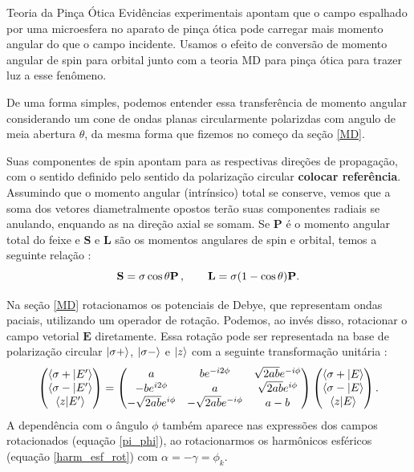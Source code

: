 \begin{chapter}{Teoria da Pinça Ótica}
Evidências experimentais apontam que o campo espalhado por uma microesfera no aparato de pinça ótica pode carregar mais momento angular do que o campo incidente. Usamos o efeito de conversão de momento angular de spin para orbital junto com a teoria MD para pinça ótica para trazer luz a esse fenômeno.

De uma forma simples, podemos entender essa transferência de momento angular considerando um cone de ondas planas circularmente polarizdas com angulo de meia abertura $\theta$, da mesma forma que fizemos no começo da seção \ref{MD}. 

Suas componentes de spin apontam para as respectivas direções de propagação, com o sentido definido pelo sentido da polarização circular {\bf colocar referência}. Assumindo que o momento angular (intrínsico) total se conserve, vemos que a soma dos vetores diametralmente opostos terão suas componentes radiais se anulando, enquando as na direção axial se somam. Se ${\mathbf P}$ é o momento angular total do feixe e ${\mathbf S}$ e ${\mathbf L}$ são os momentos angulares de spin e orbital, temos a seguinte relação \cite{Bliokh2015}:
%
\begin{equation}
{\mathbf S}=\sigma\cos\theta{\mathbf P}\thinspace, \quad\quad {\mathbf L}=\sigma(1-\cos\theta){\mathbf P}.
\end{equation}
%

Na seção \ref{MD} rotacionamos os potenciais de Debye, que representam ondas paciais, utilizando um operador de rotação. Podemos, ao invés disso, rotacionar o campo vetorial ${\mathbf E}$ diretamente. Essa rotação pode ser representada na base de polarização circular $\ket{\sigma +}$, $\ket{\sigma -}$ e $\ket{z}$ com a seguinte transformação unitária \cite{Bliokh2011}:
%
\begin{equation}
\begin{pmatrix}
\braket{\sigma+|E'} \\
\braket{\sigma-|E'} \\
\braket{z|E'} 
\end{pmatrix}
=
\begin{pmatrix}
a & be^{-i2\phi} & \sqrt{2ab}e^{-i\phi} \\
-be^{i2\phi} & a & \sqrt{2ab}e^{i\phi} \\
-\sqrt{2ab}e^{i\phi} & -\sqrt{2ab}e^{-i\phi} & a-b
\end{pmatrix}
\begin{pmatrix}
\braket{\sigma+|E} \\
\braket{\sigma-|E} \\
\braket{z|E} 
\end{pmatrix}.
\end{equation}
%
A dependência com o ângulo $\phi$ também aparece nas expressões dos campos rotacionados (equação \ref{pi_phi}), ao rotacionarmos os harmônicos esféricos (equação \ref{harm_esf_rot}) com $\alpha=-\gamma=\phi_k$.


\end{chapter}
